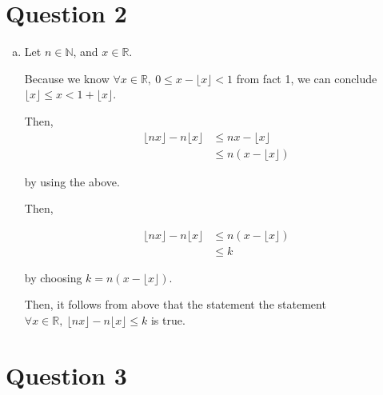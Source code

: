 \documentclass[12pt]{article}
\begin{document}
\section*{Question 2}

\begin{enumerate}[a.]
    \item

    Let $n \in \mathbb{N}$, and $x \in \mathbb{R}$.

    \bigskip

    Because we know $\forall x \in \mathbb{R},\: 0 \leq x - \lfloor x \rfloor < 1$ from
    fact 1, we can conclude $\lfloor x \rfloor \leq x < 1 + \lfloor x \rfloor$.

    \bigskip

    Then,
    \setcounter{equation}{0}
    \begin{align}
        \lfloor nx \rfloor - n \lfloor x \rfloor &\leq nx - \lfloor x \rfloor\\
        &\leq n(x - \lfloor x \rfloor)
    \end{align}

    by using the above.

    \bigskip

    Then,

    \begin{align}
        \lfloor nx \rfloor - n \lfloor x \rfloor &\leq n(x - \lfloor x \rfloor)\\
        &\leq k
    \end{align}

    by choosing $k = n(x - \lfloor x \rfloor)$.

    \bigskip

    Then, it follows from above that the statement the statement
    $\forall x \in \mathbb{R},\:\lfloor nx \rfloor - n \lfloor x \rfloor \leq k$ is true.



\end{enumerate}

\section*{Question 3}
\end{document}
